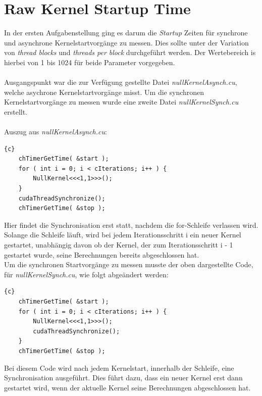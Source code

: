 \documentclass{article}
\newcommand{\enterProblemHeader}[1]{
}
\newcommand{\exitProblemHeader}[1]{
}
\newcounter{homeworkProblemCounter} %
\newcommand{\homeworkProblemName}{}
\newenvironment{homeworkProblem}[1][Problem \arabic{homeworkProblemCounter}]{ %
\stepcounter{homeworkProblemCounter} %
\renewcommand{\homeworkProblemName}{#1} %
\section{\homeworkProblemName} %
}{
}
\begin{document}
\begin{homeworkProblem}[Raw Kernel Startup Time]
In der ersten Aufgabenstellung ging es darum die \textit{Startup} Zeiten für synchrone und asynchrone Kernelstartvorgänge zu messen. Dies sollte unter der Variation von \textit{thread blocks} und \textit{threads per block} durchgeführt werden. Der Wertebereich is hierbei von 1 bis 1024 für beide Parameter vorgegeben.\\ \\
Ausgangspunkt war die zur Verfügung gestellte Datei \textit{nullKernelAsynch.cu}, welche asychrone Kernelstartvorgänge misst. Um die synchronen Kernelstartvorgänge zu messen wurde eine zweite Datei \textit{nullKernelSynch.cu} erstellt. \\ \\
Auszug aus \textit{nullKernelAsynch.cu}:
\begin{lstlisting}{c}
    chTimerGetTime( &start );
    for ( int i = 0; i < cIterations; i++ ) {
        NullKernel<<<1,1>>>();
    }
    cudaThreadSynchronize();
    chTimerGetTime( &stop );
\end{lstlisting}
Hier findet die Synchronisation erst statt, nachdem die for-Schleife verlassen wird. Solange die Schleife läuft, wird bei jedem Iterationsschritt i ein neuer Kernel gestartet, unabhängig davon ob der Kernel, der zum Iterationsschritt i - 1 gestartet wurde, seine Berechnungen bereits abgeschlossen hat.  \\ 

Um die synchronen Startvorgänge zu messen musste der oben dargestellte Code, für \textit{nullKernelSynch.cu}, wie folgt abgeändert werden:
\begin{lstlisting}{c}
    chTimerGetTime( &start );
    for ( int i = 0; i < cIterations; i++ ) {
        NullKernel<<<1,1>>>();
        cudaThreadSynchronize();
    }
    chTimerGetTime( &stop );
\end{lstlisting}
Bei diesem Code wird nach jedem Kernelstart, innerhalb der Schleife, eine Synchronisation ausgeführt. Dies führt dazu, dass ein neuer Kernel erst dann gestartet wird, wenn der aktuelle Kernel seine Berechnungen abgeschlossen hat. \\


\end{homeworkProblem}
\end{document}
